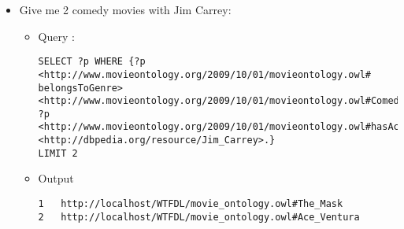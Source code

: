 \begin{itemize}
 \item Give me 2 comedy movies with Jim Carrey:
  \begin{itemize}
    \item Query : 
\begin{verbatim}
SELECT ?p WHERE {?p <http://www.movieontology.org/2009/10/01/movieontology.owl#
belongsToGenre> <http://www.movieontology.org/2009/10/01/movieontology.owl#Comedy>.
?p <http://www.movieontology.org/2009/10/01/movieontology.owl#hasActor>
<http://dbpedia.org/resource/Jim_Carrey>.}
LIMIT 2
\end{verbatim}
    \item Output
      \begin{verbatim}
1	http://localhost/WTFDL/movie_ontology.owl#The_Mask	
2	http://localhost/WTFDL/movie_ontology.owl#Ace_Ventura
      \end{verbatim}
    \end{itemize}

\end{itemize}